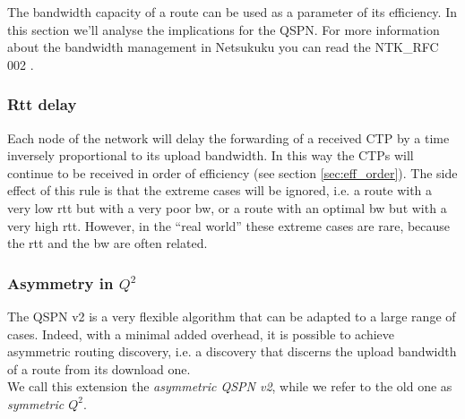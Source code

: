 \documentclass[a4paper]{article}
\begin{document}
The bandwidth capacity of a route can be used as a parameter of its
efficiency. In this section we'll analyse the implications for the QSPN.
For more information about the bandwidth management in Netsukuku you can read
the NTK\_RFC 002 \cite{ntkrfc0002}.

\subsubsection{Rtt delay}
\label{sec:rtt_delay}

Each node of the network will delay the forwarding of a received CTP by a time
inversely proportional to its upload bandwidth. In this way the CTPs will
continue to be received in order of efficiency (see section
\ref{sec:eff_order}).
The side effect of this rule is that the extreme cases will be ignored, i.e. a
route with a very low rtt but with a very poor bw, or a route with an optimal
bw but with a very high rtt. However, in the ``real world'' these extreme
cases are rare, because the rtt and the bw are often related.

\subsubsection{Asymmetry in $Q^2$}
The QSPN v2 is a very flexible algorithm that can be adapted to a large range
of cases. Indeed, with a minimal added overhead, it is possible to achieve
asymmetric routing discovery, i.e. a discovery that discerns the upload
bandwidth of a route from its download one.\\
We call this extension the \emph{asymmetric QSPN v2}, while we refer to the
old one as \emph{symmetric $Q^2$}.
\end{document}
